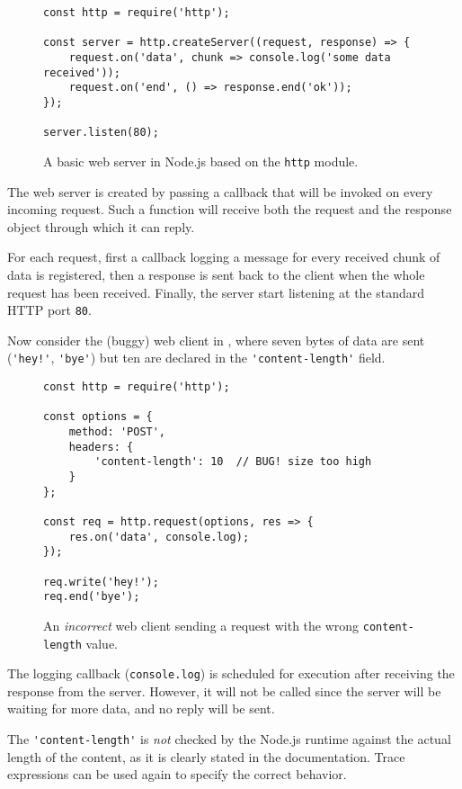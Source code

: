\begin{figure}[h]
\begin{lstlisting}
const http = require('http');

const server = http.createServer((request, response) => {
	request.on('data', chunk => console.log('some data received'));
	request.on('end', () => response.end('ok'));
});

server.listen(80);
\end{lstlisting}
\caption{A basic web server in Node.js based on the \lstinline{http} module.}
\label{lst:http}
\end{figure}

The web server is created by passing a callback that will be invoked on every incoming request.
Such a function will receive both the request and the response object through which it can reply.

For each request, first a callback logging a message for every received chunk of data is registered, then a response is sent back to the client when
the whole request has been received. %
Finally, the server start listening at the standard HTTP port \texttt{80}.

Now consider the (buggy) web client in , where seven bytes of data are sent (\lstinline{'hey!'}, \lstinline{'bye'}) but ten are declared in the \lstinline{'content-length'} field.

\begin{figure}[h]
\begin{lstlisting}
const http = require('http');

const options = {
	method: 'POST',
	headers: {
		'content-length': 10  // BUG! size too high
	}
};

const req = http.request(options, res => {
	res.on('data', console.log);
});

req.write('hey!');
req.end('bye');
\end{lstlisting}
\caption{An \emph{incorrect} web client sending a request with the wrong \texttt{content-length} value.}
\label{lst:client}
\end{figure}

The logging callback (\lstinline{console.log}) is scheduled for execution after receiving the response from the server.
However, it will not be called since the server will be waiting for more data, and no reply will be sent.

The \lstinline{'content-length'} is \emph{not} checked by the Node.js runtime against the actual length of the content, as it is clearly stated in the documentation.
Trace expressions can be used again to specify the correct behavior.

